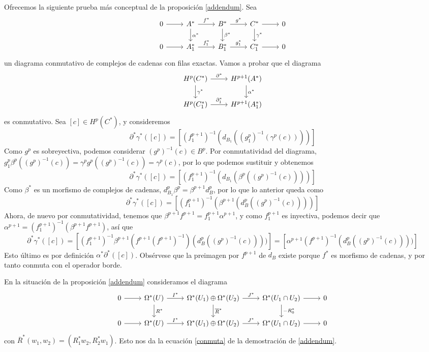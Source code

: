 \documentclass[CV.tex]{subfiles}
\begin{document}
\begin{nota}
Ofrecemos la siguiente prueba más conceptual de la proposición \ref{addendum}. Sea
\[
\begin{tikzcd}
0\arrow[r] & A^*\arrow[r, "f^*"]\arrow[d,"\alpha^*"] & B^*\arrow[r, "g^*"]\arrow[d,"\beta^*"]& C^*\arrow[d,"\gamma^*"]\arrow[r] & 0\\
0\arrow[r] & A^*_1\arrow[r, "f^*_1"] & B^*_1\arrow[r, "g^*_1"] & C^*_1\arrow[r] & 0
\end{tikzcd}
\]
un diagrama conmutativo de complejos de cadenas con filas exactas. Vamos a probar que el diagrama
\[
\begin{tikzcd}
H^p(C^*)\arrow[r, "\partial^*"]\arrow[d, "\gamma^*"] & H^{p+1}(A^*)\arrow[d,"\alpha^*"]\\
H^p(C^*_1)\arrow[r, "\partial^*_1"] & H^{p+1}(A^*_1)
\end{tikzcd}
\]
es conmutativo. Sea $[c]\in H^p(C^*)$, y consideremos 
\[
\partial^*\gamma^*([c])=[(f_1^{p+1})^{-1}(d_{B_1}((g_1^p)^{-1}(\gamma^p(c))))]
\]
Como $g^p$ es sobreyectiva, podemos considerar $(g^p)^{-1}(c)\in B^p$. Por conmutatividad del diagrama, $g_1^p\beta^p((g^p)^{-1}(c))=\gamma^pg^p((g^p)^{-1}(c))=\gamma^p(c)$, por lo que podemos sustituir y obtenemos
\[
\partial^*\gamma^*([c])=[(f_1^{p+1})^{-1}(d_{B_1}(\beta^p((g^p)^{-1}(c))))]
\]
Como $\beta^*$ es un morfismo de complejos de cadenas, $d^p_{B_1}\beta^p=\beta^{p+1}d^p_B$, por lo que lo anterior queda como
\[
\partial^*\gamma^*([c])=[(f_1^{p+1})^{-1}(\beta^{p+1}(d_B^p((g^p)^{-1}(c))))]
\]
Ahora, de nuevo por conmutatividad, tenemos que $\beta^{p+1}f^{p+1}=f_1^{p+1}\alpha^{p+1}$, y como $f_1^{p+1}$ es inyectiva, podemos decir que $\alpha^{p+1}=(f_1^{p+1})^{-1}(\beta^{p+1}f^{p+1})$, así que
\[
\partial^*\gamma^*([c])=[(f_1^{p+1})^{-1}\beta^{p+1}(f^{p+1}(f^{p+1})^{-1})(d_B^p((g^p)^{-1}(c))))]=[\alpha^{p+1}(f^{p+1})^{-1}(d_B^p((g^p)^{-1}(c))))]
\]
Esto último es por definición $\alpha^*\partial^*([c])$. Obsérvese que la preimagen por $f^{p+1}$ de $d_B$ existe porque $f^*$ es morfismo de cadenas, y por tanto conmuta con el operador borde. 

En la situación de la proposición \ref{addendum} consideramos el diagrama
\[
\begin{tikzcd}
0\arrow[r] & \Omega^*(U)\arrow[r, "I^*"]\arrow[d,"R^*"] & \Omega^*(U_1)\oplus \Omega^*(U_2)\arrow[r, "J^*"]\arrow[d,"\overline{R}^*"]& \Omega^*(U_1\cap U_2)\arrow[d,"-R_0^*"]\arrow[r] & 0\\
0\arrow[r] &  \Omega^*(U)\arrow[r, "I^*"] & \Omega^*(U_1)\oplus\Omega^*(U_2)\arrow[r, "J^*"] & \Omega^*(U_1\cap U_2)\arrow[r] & 0
\end{tikzcd}
\]
con $\overline{R}^*(w_1,w_2)=(R_1^*w_2,R_2^*w_1)$. Esto nos da la ecuación \ref{conmuta} de la demostración de \ref{addendum}. 
\end{nota}
\end{document}
